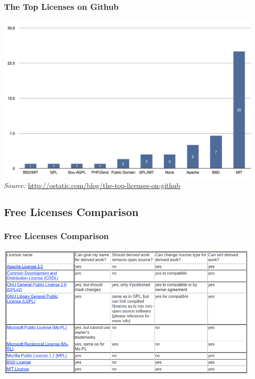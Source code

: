 \documentclass{beamer}
\begin{document}

\begin{frame}
\frametitle{The Top Licenses on Github}

\begin{center}


\medskip

\includegraphics[scale=0.5,clip=true]{figs/licenses-github.jpg} \\
\footnotesize
\textit{Source:} \url{http://ostatic.com/blog/the-top-licenses-on-github}
\end{center}


\end{frame}


\subsection{Free Licenses Comparison}
\begin{frame}
\frametitle{Free Licenses Comparison}

\begin{center}
\includegraphics[scale=0.32,clip=true]{figs/licenses-comparison.png}
\end{center}

\end{frame}
\end{document}
